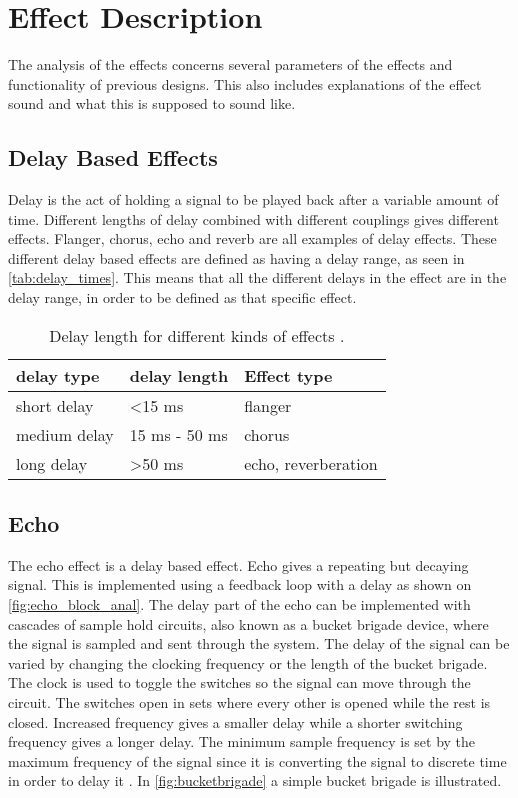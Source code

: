 \section{Effect Description}\label{sec:effect_descr}
The analysis of the effects concerns several parameters of the effects and functionality of previous designs. This also includes explanations of the effect sound and what this is supposed to sound like.

\subsection{Delay Based Effects}
Delay is the act of holding a signal to be played back after a variable amount of time. 
Different lengths of delay combined with different couplings gives different effects. Flanger, chorus, echo and reverb are all examples of delay effects. These different delay based effects are defined as having a delay range, as seen in \autoref{tab:delay_times}. This means that all the different delays in the effect are in the delay range, in order to be defined as that specific effect.

\begin{table}[htbp]
\centering
\caption{Delay length for different kinds of effects \citep{DAFX}.}
\label{tab:delay_times}
\begin{tabular}{|l|l|l|}
\hline
\rowcolor{lightgray}
delay type   & delay length       & Effect type          \\ \hline
short delay  & \textless 15 ms    & flanger \\ \hline
medium delay & 15 ms - 50 ms      & chorus \\ \hline
long delay   & \textgreater 50 ms & echo, reverberation  \\ \hline
\end{tabular}
\end{table}

\subsection{Echo}
The echo effect is a delay based effect. Echo gives a repeating but decaying signal. This is implemented using a feedback loop with a delay as shown on \autoref{fig:echo_block_anal}. The delay part of the echo can be implemented with cascades of sample hold circuits, also known as a bucket brigade device, where the signal is sampled and sent through the system. The delay of the signal can be varied by changing the clocking frequency or the length of the bucket brigade. The clock is used to toggle the switches so the signal can move through the circuit. The switches open in sets where every other is opened while the rest is closed. Increased frequency gives a smaller delay while a shorter switching frequency gives a longer delay. The minimum sample frequency is set by the maximum frequency of the signal since it is converting the signal to discrete time in order to delay it \citep{se_bucket_brigade}. In \autoref{fig:bucketbrigade} a simple bucket brigade is illustrated.


